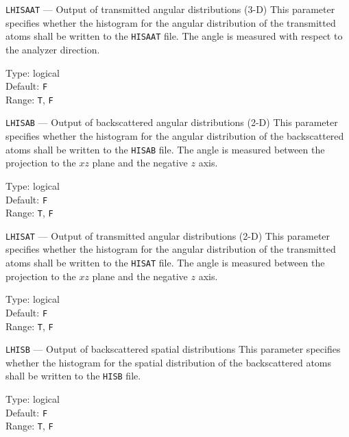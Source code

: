 \begin{keydescription}{\texttt{LHISAAT} --- Output of transmitted angular distributions (3-D)}
%
  This parameter specifies whether the histogram for the angular distribution of the 
  transmitted atoms shall be written to the \texttt{HISAAT} file. The angle is measured
  with respect to the analyzer direction.
  \begin{keytab}
    Type:    \> logical \\
    Default: \> \texttt{F} \\
    Range:   \> \texttt{T}, \texttt{F} 
  \end{keytab}
\end{keydescription}

\begin{keydescription}{\texttt{LHISAB} --- Output of backscattered angular distributions (2-D)}
%
  This parameter specifies whether the histogram for the angular distribution of the 
  backscattered atoms shall be written to the \texttt{HISAB} file. The angle is measured
  between the projection to the $xz$ plane and the negative $z$ axis.
  \begin{keytab}
    Type:    \> logical \\
    Default: \> \texttt{F} \\
    Range:   \> \texttt{T}, \texttt{F} 
  \end{keytab}
\end{keydescription}

\begin{keydescription}{\texttt{LHISAT} --- Output of transmitted angular distributions (2-D)}
%
  This parameter specifies whether the histogram for the angular distribution of the 
  transmitted atoms shall be written to the \texttt{HISAT} file. The angle is measured
  between the projection to the $xz$ plane and the negative $z$ axis.
  \begin{keytab}
    Type:    \> logical \\
    Default: \> \texttt{F} \\
    Range:   \> \texttt{T}, \texttt{F} 
  \end{keytab}
\end{keydescription}

\begin{keydescription}{\texttt{LHISB} --- Output of backscattered spatial distributions}
%
  This parameter specifies whether the histogram for the spatial distribution of the 
  backscattered atoms shall be written to the \texttt{HISB} file.
  \begin{keytab}
    Type:    \> logical \\
    Default: \> \texttt{F} \\
    Range:   \> \texttt{T}, \texttt{F} 
  \end{keytab}
\end{keydescription}

